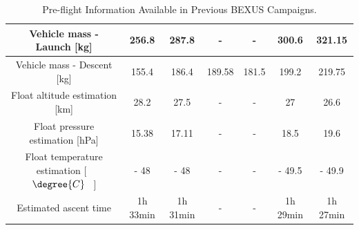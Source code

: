 \documentclass[a4paper,12pt,oneside]{article} %
\providecommand{\DIFaddendFL}{} %
\DeclareRobustCommand{\DIFaddendFL}{\DIFOaddendFL \let\includegraphics\DIFOincludegraphics} %
\begin{document}
\begin{appendices}
\begin{table}[H]
{{\begin{tabular}{c|c|c|c|c|c|c|}
\multicolumn{1}{|c|}{Vehicle mass - Launch {[}kg{]}} & 256.8 & 287.8 & - & - & 300.6 & 321.15 \\ \hline
\multicolumn{1}{|c|}{Vehicle mass - Descent {[}kg{]}} & 155.4 & 186.4 & 189.58 & 181.5 & 199.2 & 219.75 \\ \hline
\multicolumn{1}{|c|}{Float altitude estimation {[}km{]}} & 28.2 & 27.5 & - & - & 27 & 26.6 \\ \hline
\multicolumn{1}{|c|}{Float pressure estimation {[}hPa{]}} & 15.38 & 17.11 & - & - & 18.5 & 19.6 \\ \hline
\multicolumn{1}{|c|}{Float temperature estimation {[}\mbox{%
$\degree{C}$
}%
{]}} & - 48 & - 48 & - & - & - 49.5 & - 49.9 \\ \hline
\multicolumn{1}{|c|}{Estimated ascent time} & 1h 33min & 1h 31min & - & - & 1h 29min & 1h 27min \\ \hline
\end{tabular}}\DIFaddendFL }
\caption{Pre-flight Information Available in Previous BEXUS Campaigns.}
\label{table:pre-flight}
\end{table}


\begin{table}[H]

\noindent{}
\caption{Post-flight Information Regarding the Flight Profile for Previous BEXUS Campaings.} \label{table:post-flight}
\end{table}


\end{appendices}
\end{document}
